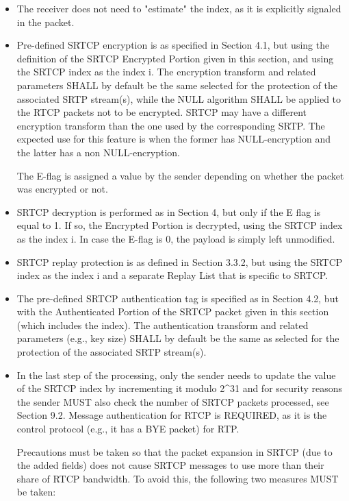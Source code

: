 \documentclass{article}
\begin{document}
\begin{itemize}
\item The receiver does not need to "estimate" the index, as it is explicitly signaled in the packet.
\item Pre-defined SRTCP encryption is as specified in Section 4.1, but using the definition of the SRTCP Encrypted Portion given in this section, and using the SRTCP index as the index i.  The encryption transform and related parameters SHALL by default be the same selected for the protection of the associated SRTP stream(s), while the NULL algorithm SHALL be applied to the RTCP packets not to be encrypted.  SRTCP may have a different encryption transform
than the one used by the corresponding SRTP.  The expected use for this feature is when the former has NULL-encryption and the latter has a non NULL-encryption.

The E-flag is assigned a value by the sender depending on whether the packet was encrypted or not.

\item SRTCP decryption is performed as in Section 4, but only if the E flag is equal to 1.  If so, the Encrypted Portion is decrypted, using the SRTCP index as the index i.  In case the E-flag is 0, the payload is simply left unmodified.
\item SRTCP replay protection is as defined in Section 3.3.2, but using the SRTCP index as the index i and a separate Replay List that is specific to SRTCP.
\item The pre-defined SRTCP authentication tag is specified as in Section 4.2, but with the Authenticated Portion of the SRTCP packet given in this section (which includes the index).  The authentication transform and related parameters (e.g., key size) SHALL by default be the same as selected for the protection of the associated SRTP stream(s).
\item In the last step of the processing, only the sender needs to update the value of the SRTCP index by incrementing it modulo 2\textasciicircum{}31 and for security reasons the sender MUST also check the number of SRTCP packets processed, see Section 9.2.
Message authentication for RTCP is REQUIRED, as it is the control protocol (e.g., it has a BYE packet) for RTP.

Precautions must be taken so that the packet expansion in SRTCP (due to the added fields) does not cause SRTCP messages to use more than their share of RTCP bandwidth.  To avoid this, the following two measures MUST be taken:


\end{itemize}
\end{document}
